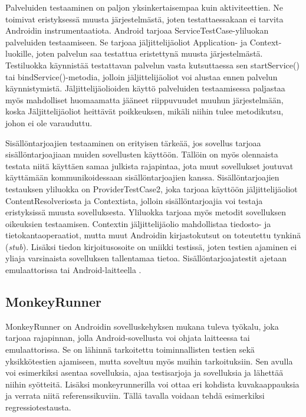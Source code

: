 Palveluiden testaaminen on paljon yksinkertaisempaa kuin aktiviteettien. Ne toimivat eristyksessä muusta järjestelmästä, joten testattaessakaan ei tarvita Androidin instrumentaatiota. Android tarjoaa ServiceTestCase-yliluokan palveluiden testaamiseen. Se tarjoaa jäljittelijäoliot Application- ja Context-luokille, joten palvelun saa testattua eristettynä muusta järjestelmästä. Testiluokka käynnistää testattavan palvelun vasta kutsuttaessa sen startService() tai bindService()-metodia, jolloin jäljittelijäoliot voi alustaa ennen palvelun käynnistymistä. Jäljittelijäolioiden käyttö palveluiden testaamisessa paljastaa myös mahdolliset huomaamatta jääneet riippuvuudet muuhun järjestelmään, koska Jäljittelijäoliot heittävät poikkeuksen, mikäli niihin tulee metodikutsu, johon ei ole varauduttu.

Sisällöntarjoajien testaaminen on erityisen tärkeää, jos sovellus tarjoaa sisällöntarjoajiaan muiden sovellusten käyttöön. Tällöin on myös olennaista testata niitä käyttäen samaa julkista rajapintaa, jota muut sovellukset joutuvat käyttämään kommunikoidessaan sisällöntarjoajien kanssa. Sisällöntarjoajien testauksen yliluokka on ProviderTestCase2, joka tarjoaa käyttöön jäljittelijäoliot ContentResolveriosta ja Contextista, jolloin sisällöntarjoajia voi testaja eristyksissä muusta sovelluksesta. Yliluokka tarjoaa myös metodit sovelluksen oikeuksien testaamisen. Contextin jäljittelijäolio mahdollistaa tiedosto- ja tietokantaoperaatiot, mutta muut Androidin kirjastokutsut on toteutettu tynkinä (\emph{stub}). Lisäksi tiedon kirjoitusosoite on uniikki testissä, joten testien ajaminen ei yliaja varsinaista sovelluksen tallentamaa tietoa. Sisällöntarjoajatestit ajetaan emulaattorissa tai Android-laitteella \cite{android_testing}.

\subsection{MonkeyRunner}
\label{monkeyrunner}

MonkeyRunner \cite{monkeyrunner} on Androidin sovelluskehyksen mukana tuleva työkalu, joka tarjoaa rajapinnan, jolla Android-sovellusta voi ohjata laitteessa tai emulaattorissa. Se on lähinnä tarkoitettu toiminnallisten testien sekä yksikkötestien ajamiseen, mutta soveltuu myös muihin tarkoituksiin. Sen avulla voi esimerkiksi asentaa sovelluksia, ajaa testisarjoja ja sovelluksia ja lähettää niihin syötteitä. Lisäksi monkeyrunnerilla voi ottaa eri kohdista kuvakaappauksia ja verrata niitä referenssikuviin. Tällä tavalla voidaan tehdä esimerkiksi regressiotestausta.

